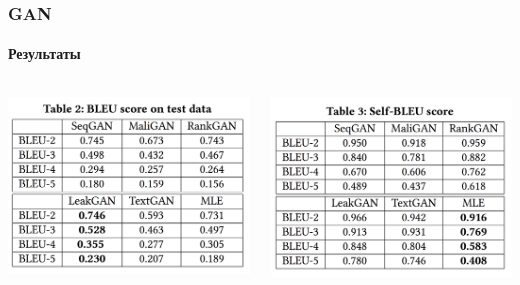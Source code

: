 \documentclass[10pt]{beamer}
\begin{document}
\begin{frame}
\frametitle{GAN}
\framesubtitle{Результаты}

\begin{columns}
    \begin{column}{0.5\textwidth}
        \begin{center}
            \includegraphics[width=\textwidth]{images/gan_bleu.png}
        \end{center}
    \end{column}
    \begin{column}{0.5\textwidth}
        \begin{center}
            \includegraphics[width=\textwidth]{images/gan_self_bleu.png}
        \end{center}
    \end{column}
\end{columns}

\end{frame}
\end{document}

